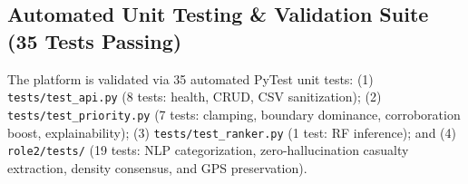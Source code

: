 \documentclass[10pt,a4paper]{article}
\begin{document}
\subsection{Automated Unit Testing \& Validation Suite (35 Tests Passing)}
The platform is validated via 35 automated PyTest unit tests: (1) \texttt{tests/test\_api.py} (8 tests: health, CRUD, CSV sanitization); (2) \texttt{tests/test\_priority.py} (7 tests: clamping, boundary dominance, corroboration boost, explainability); (3) \texttt{tests/test\_ranker.py} (1 test: RF inference); and (4) \texttt{role2/tests/} (19 tests: NLP categorization, zero-hallucination casualty extraction, density consensus, and GPS preservation).

\end{document}
